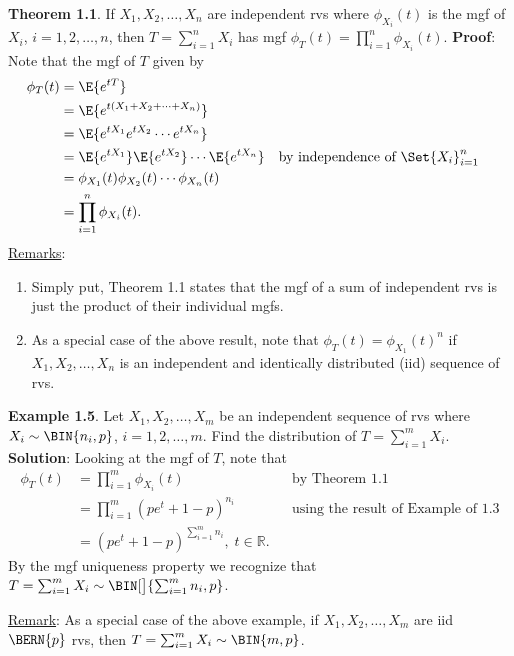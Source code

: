 \begin{Result}
    \textbf{Theorem 1.1}. If $ X_1,X_2,\ldots,X_n $ are independent rvs where $ \phi_{X_i}(t) $ is the mgf of $ X_i $,
    $ i=1,2,\ldots,n $, then $ T=\sum_{i=1}^{n} X_i $ has mgf $ \phi_T(t)=\prod_{i=1}^n \phi_{X_i}(t) $.
    \tcblower{}
    \textbf{Proof}: Note that the mgf of $ T $ given by
    \begin{align*}
        \phi_T(t)
         & =\E{e^{tT}}                                                                                         \\
         & =\E{e^{t(X_1+X_2+\cdots+X_n)}}                                                                      \\
         & =\E{e^{tX_1}e^{tX_2}\cdots e^{tX_n}}                                                                \\
         & =\E{e^{tX_1}}\E{e^{tX_2}}\cdots\E{e^{tX_n}}    &  & \text{by independence of $ \Set{X_i}_{i=1}^n $} \\
         & =\phi_{X_1}(t)\phi_{X_2}(t)\cdots\phi_{X_n}(t)                                                      \\
         & =\prod_{i=1}^n \phi_{X_i}(t).
    \end{align*}
    \underline{Remarks}:
    \begin{enumerate}[(1)]
        \item Simply put, Theorem 1.1 states that the mgf of a sum of independent rvs is just the
              product of their individual mgfs.
        \item As a special case of the above result, note that $ \phi_T(t)=\phi_{X_1}(t)^n $ if $ X_1,X_2,\ldots,X_n $
              is an independent and identically distributed (iid) sequence of rvs.
    \end{enumerate}
\end{Result}
\begin{Example}
    \textbf{Example 1.5}. Let $ X_1,X_2,\ldots,X_m $ be an independent sequence of rvs where $ X_i \sim \BIN{n_i,p} $,
    $ i=1,2,\ldots,m $. Find the distribution of $ T=\sum_{i=1}^{m} X_i $.
    \tcblower{}
    \textbf{Solution}: Looking at the mgf of $ T $, note that
    \begin{align*}
        \phi_T(t)
         & =\prod_{i=1}^m \phi_{X_i}(t)                       &  & \text{by Theorem 1.1}                     \\
         & =\prod_{i=1}^m (pe^t+1-p)^{n_i}                    &  & \text{using the result of Example of 1.3} \\
         & =(pe^t+1-p)^{\sum_{i=1}^{m} n_i},\;t\in\mathbb{R}.
    \end{align*}
    By the mgf uniqueness property we recognize that $ T=\sum_{i=1}^{m} X_i \sim \BIN[\big]{\sum_{i=1}^{m} n_i,p} $.

    \underline{Remark}: As a special case of the above example, if $ X_1,X_2,\ldots,X_m $ are iid $ \BERN{p} $ rvs, then
    $ T=\sum_{i=1}^{m} X_i\sim \BIN{m,p} $.
\end{Example}
